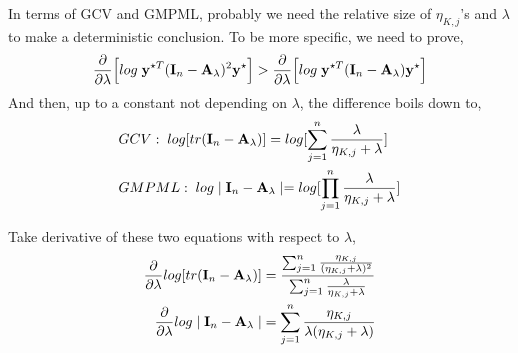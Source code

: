 \documentclass[11pt]{article}
\begin{document}

In terms of GCV and GMPML, probably we need the relative size of $\eta_{K, j}$'s and $\lambda$ to make a deterministic conclusion. To be more specific, we need to prove,
\begin{align*}
\frac{\partial }{\partial \lambda}\Big[log\; {\bf y}^{\star T}({\bf I}_n-{\bf A}_\lambda)^2{\bf y}^\star\Big]>\frac{\partial }{\partial \lambda}\Big[log\; {\bf y}^{\star T}({\bf I}_n-{\bf A}_\lambda){\bf y}^\star\Big]
\end{align*}
And then, up to a constant not depending on $\lambda$, the difference boils down to,
\begin{align}
&GCV: \; log[tr({\bf I}_n-{\bf A}_\lambda)]=log[\sum_{j=1}^n\frac{\lambda}{\eta_{K, j}+\lambda}]\\
&GMPML: \; log\mid {\bf I}_n-{\bf A}_\lambda\mid=log[\prod_{j=1}^n\frac{\lambda}{\eta_{K, j}+\lambda}]
\end{align}

Take derivative of these two equations with respect to $\lambda$,
\begin{align*}
\frac{\partial }{\partial \lambda}log[tr({\bf I}_n-{\bf A}_\lambda)]&=\frac{\sum_{j=1}^n\frac{\eta_{K, j}}{(\eta_{K, j}+\lambda)^2}}{\sum_{j=1}^n\frac{\lambda}{\eta_{K, j}+\lambda}}\\
\frac{\partial }{\partial \lambda}log\mid {\bf I}_n-{\bf A}_\lambda\mid&=\sum_{j=1}^n\frac{\eta_{K, j}}{\lambda(\eta_{K, j}+\lambda)}
\end{align*}
\end{document}
